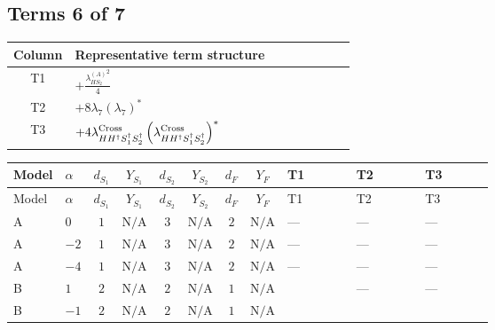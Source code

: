 \documentclass[8pt]{article}
\begin{document}
\begin{landscape}
\subsection*{Terms 6 of 7}
\begin{center}
\begin{tabular}{@{}c >{\raggedright\arraybackslash}p{0.82\linewidth}@{}}
\toprule
Column & Representative term structure \\
\midrule
T1 & \(\displaystyle +\frac{{\lambda_{HS_2}^{(A)}}^2}{4}\) \\
\midrule
T2 & \(\displaystyle +8 {\lambda_{7}} \left({\lambda_{7}}\right)^{*}\) \\
\midrule
T3 & \(\displaystyle +4 {\lambda_{H H^\dagger S_1^\dagger S_2^\dagger}^{\rm Cross}} \left({\lambda_{H H^\dagger S_1^\dagger S_2^\dagger}^{\rm Cross}}\right)^{*}\) \\
\midrule
\bottomrule
\end{tabular}
\end{center}
\smallskip
\tiny
\begin{longtable}{@{}llcccccc >{\raggedright\arraybackslash}p{0.21\linewidth} >{\raggedright\arraybackslash}p{0.21\linewidth} >{\raggedright\arraybackslash}p{0.21\linewidth}@{}}
\toprule
Model & $\alpha$ & $d_{S_1}$ & $Y_{S_1}$ & $d_{S_2}$ & $Y_{S_2}$ & $d_F$ & $Y_F$ & T1 & T2 & T3 \\
\midrule
\endfirsthead
\toprule
Model & $\alpha$ & $d_{S_1}$ & $Y_{S_1}$ & $d_{S_2}$ & $Y_{S_2}$ & $d_F$ & $Y_F$ & T1 & T2 & T3 \\
\midrule
\endhead
A & $0$ & $1$ & $\text{N/A}$ & $3$ & $\text{N/A}$ & $2$ & $\text{N/A}$ & --- & --- & --- \\
\midrule
A & $-2$ & $1$ & $\text{N/A}$ & $3$ & $\text{N/A}$ & $2$ & $\text{N/A}$ & --- & --- & --- \\
\midrule
A & $-4$ & $1$ & $\text{N/A}$ & $3$ & $\text{N/A}$ & $2$ & $\text{N/A}$ & --- & --- & --- \\
\midrule
B & $1$ & $2$ & $\text{N/A}$ & $2$ & $\text{N/A}$ & $1$ & $\text{N/A}$ & \scriptsize\adjustbox{max width=\linewidth}{$\begin{gathered} +\frac{{\lambda_{HS_2}^{(A)}}^2}{4}\end{gathered}$} & --- & --- \\
\midrule
B & $-1$ & $2$ & $\text{N/A}$ & $2$ & $\text{N/A}$ & $1$ & $\text{N/A}$ & \scriptsize\adjustbox{max width=\linewidth}{$\begin{gathered} +\frac{{\lambda_{HS_2}^{(A)}}^2}{4}\end{gathered}$} & \scriptsize\adjustbox{max width=\linewidth}{$\begin{gathered} +8 {\lambda_{7}} \left({\lambda_{7}}\right)^{*}\end{gathered}$} & \scriptsize\adjustbox{max width=\linewidth}{$\begin{gathered} +4 {\lambda_{H H^\dagger S_1^\dagger S_2^\dagger}^{\rm Cross}} \left({\lambda_{H H^\dagger S_1^\dagger S_2^\dagger}^{\rm Cross}}\right)^{*}\end{gathered}$} \\

\end{longtable}
\end{landscape}
\end{document}
